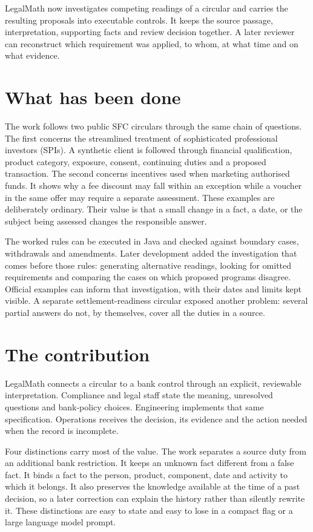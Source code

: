 \documentclass[12pt,a4paper,oneside,openany]{book}
\begin{document}
LegalMath now investigates competing readings of a circular and carries the
resulting proposals into executable controls. It keeps the source passage,
interpretation, supporting facts and review decision together. A later reviewer
can reconstruct which requirement was applied, to whom, at what time and on what
evidence.

\section*{What has been done}

The work follows two public SFC circulars through the same chain of questions.
The first concerns the streamlined treatment of sophisticated professional
investors (SPIs). A synthetic client is followed through financial qualification,
product category, exposure, consent, continuing duties and a proposed
transaction. The second concerns incentives used when marketing authorised
funds. It shows why a fee discount may fall within an exception while a voucher
in the same offer may require a separate assessment. These examples are
deliberately ordinary. Their value is that a small change in a fact, a date, or
the subject being assessed changes the responsible answer.

The worked rules can be executed in Java and checked against boundary cases,
withdrawals and amendments. Later development added the investigation that comes
before those rules: generating alternative readings, looking for omitted
requirements and comparing the cases on which proposed programs disagree.
Official examples can inform that investigation, with their dates and limits
kept visible. A separate settlement-readiness circular exposed another problem:
several partial answers do not, by themselves, cover all the duties in a source.

\section*{The contribution}

LegalMath connects a circular to a bank control through an explicit, reviewable
interpretation. Compliance and legal staff state the meaning, unresolved
questions and bank-policy choices. Engineering implements that same
specification. Operations receives the decision, its evidence and the action
needed when the record is incomplete.

\newpage
Four distinctions carry most of the value. The work separates a source duty
from an additional bank restriction. It keeps an unknown fact different from a
false fact. It binds a fact to the person, product, component, date and activity
to which it belongs. It also preserves the knowledge available at the time of a
past decision, so a later correction can explain the history rather than silently
rewrite it. These distinctions are easy to state and easy to lose in a compact
flag or a large language model prompt.
\end{document}
